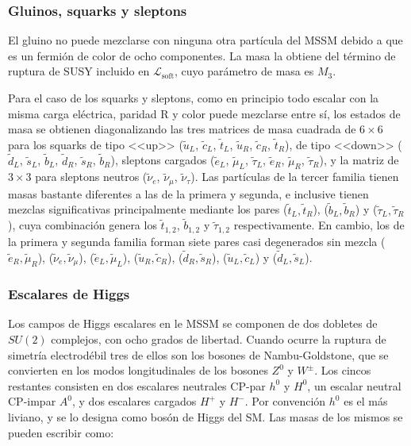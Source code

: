 \subsubsection{Gluinos, squarks y sleptons}

El gluino no puede mezclarse con ninguna otra partícula del MSSM debido a
que es un fermión de color de ocho componentes. La masa la obtiene del término de ruptura de SUSY incluido en $\mathcal{L}_{\text{soft}}$, cuyo parámetro de masa es $M_3$.

Para el caso de los squarks y sleptons, como en principio todo escalar con la misma carga eléctrica, paridad R y color puede mezclarse entre sí, los estados de masa se obtienen diagonalizando las tres matrices de masa cuadrada de $6\times6$ para los squarks de tipo <<up>> ($\tilde{u}_L$, $\tilde{c}_L$, $\tilde{t}_L$, $\tilde{u}_R$, $\tilde{c}_R$, $\tilde{t}_R$), de tipo <<down>> ($\tilde{d}_L$, $\tilde{s}_L$, $\tilde{b}_L$, $\tilde{d}_R$, $\tilde{s}_R$, $\tilde{b}_R$), sleptons cargados ($\tilde{e}_L$, $\tilde{\mu}_L$, $\tilde{\tau}_L$, $\tilde{e}_R$, $\tilde{\mu}_R$, $\tilde{\tau}_R$), y la matriz de $3\times3$ para sleptons neutros ($\tilde{\nu}_e$, $\tilde{\nu}_{\mu}$, $\tilde{\nu}_{\tau}$). Las partículas de la tercer familia tienen masas bastante diferentes a las de la primera y segunda, e inclusive tienen mezclas significativas principalmente mediante los pares ($\tilde{t}_L, \tilde{t}_R$), ($\tilde{b}_L, \tilde{b}_R$) y ($\tilde{\tau}_L, \tilde{\tau}_R$), cuya combinación genera los $\tilde{t}_{1,2}$, $\tilde{b}_{1,2}$ y $\tilde{\tau}_{1,2}$ respectivamente. En cambio, los de la primera y segunda familia forman siete pares casi degenerados sin mezcla ($\tilde{e}_R, \tilde{\mu}_R$), ($\tilde{\nu}_e, \tilde{\nu}_\mu$), ($\tilde{e}_L, \tilde{\mu}_L$), ($\tilde{u}_R, \tilde{c}_R$), ($\tilde{d}_R, \tilde{s}_R$), ($\tilde{u}_L, \tilde{c}_L$) y ($\tilde{d}_L, \tilde{s}_L$).





\subsubsection{Escalares de Higgs}

Los campos de Higgs escalares en le MSSM se componen de dos dobletes de $SU(2)$ complejos, con ocho grados de libertad. Cuando ocurre la ruptura de simetría electrodébil tres de ellos son los bosones de Nambu-Goldstone, que se convierten en los modos longitudinales de los bosones $Z^0$ y $W^{\pm}$. Los cincos restantes consisten en dos escalares neutrales CP-par $h^0$ y $H^0$, un escalar neutral CP-impar $A^0$, y dos escalares cargados $H^+$ y $H^-$. Por convención $h^0$ es el más liviano, y se lo designa como bosón de Higgs del SM. Las masas de los mismos se pueden escribir como:

